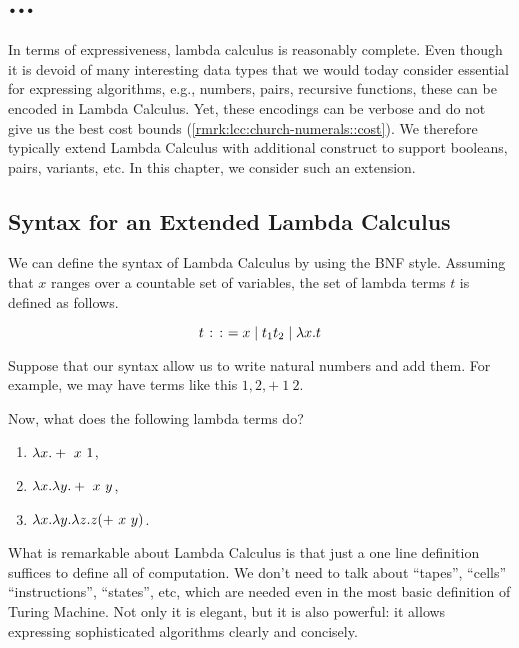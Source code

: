 \chapter{...}
\label{ch:semantics::syntax}

\begin{preamble}
In terms of expressiveness, lambda calculus is reasonably complete.
%
Even though it is devoid of many interesting data types that we would today consider essential for expressing algorithms, e.g., numbers, pairs, recursive functions, these can be encoded in Lambda Calculus.
%
Yet, these encodings can be verbose and do not give us the best cost
bounds (\ref{rmrk:lcc:church-numerals::cost}).
%
We therefore typically extend Lambda Calculus with additional construct to support booleans, pairs, variants, etc.
%
In this chapter, we consider such an extension. 
\end{preamble}

\section{Syntax for an Extended Lambda Calculus}
\label{sec:lce::syntax}


\begin{definition}
\label{def:lce::syn} 
We can define the syntax of Lambda Calculus by using the BNF style. 
%
Assuming that $x$ ranges over a countable set of variables, the set of
lambda terms $t$ is defined as follows.

\[
t \mathrel{\colon\colon\mathord{=}} x \mathrel{\mid} t_1 t_2 \mathrel{\mid} \lambda x.t
\]
\end{definition}



\begin{exercise}
\label{xrcs:lce::syn::bnf} 
Suppose that our syntax allow us to write natural numbers and add
them.  For example, we may have terms like this $1, 2, +~1~2$.

Now, what does the following lambda terms do?
\begin{enumerate}
\item $\lambda x. +~x~1$,
\item $\lambda x. \lambda y. +~x~y$,
\item $\lambda x. \lambda y. \lambda z.  z (+~x~y)$.
\end{enumerate}
\end{exercise}


\begin{gram}[Summary]
\label{grm:lce::syn::summary} 
What is remarkable about Lambda Calculus is that just a one line definition suffices to define all of computation.
%
We don't need to talk about ``tapes'', ``cells'' ``instructions'', ``states'', etc, which are needed even in the most basic definition of Turing Machine.
%
Not only it is  elegant, but it is also powerful: it allows expressing sophisticated algorithms clearly and concisely.
%

\end{gram}

